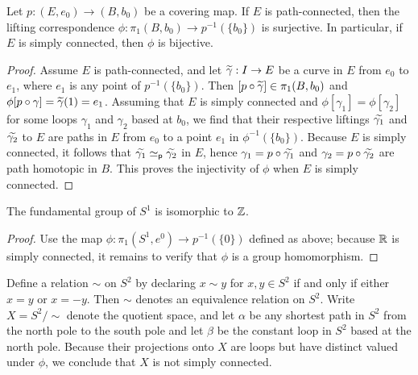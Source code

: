 \begin{thm}
    Let $p: (E, e_0)\rightarrow (B, b_0)$ be a covering map.
    If $E$ is path-connected, then the lifting correspondence $\phi: \pi_1(B, b_0)\rightarrow p^{-1}(\{b_0\})$ is surjective.
    In particular, if $E$ is simply connected, then $\phi$ is bijective.
\end{thm}
\begin{proof}
    Assume $E$ is path-connected, and let $\widetilde{\gamma}: I\rightarrow E$ be a curve in $E$ from $e_0$ to $e_1$, where $e_1$ is any point of $p^{-1}(\{b_0\})$.
    Then $[p\circ\widetilde{\gamma}]\in \pi_1(B, b_0)$ and $\phi[p\circ\gamma]=\widetilde{\gamma}(1)=e_1$.
    Assuming that $E$ is simply connected and $\phi[\gamma_1]=\phi[\gamma_2]$ for some loops $\gamma_1$ and $\gamma_2$ based at $b_0$, we find that their respective liftings $\widetilde{\gamma_1}$ and $\widetilde{\gamma_2}$ to $E$ are paths in $E$ from $e_0$ to a point $e_1$ in $\phi^{-1}(\{b_0\})$.
    Because $E$ is simply connected, it follows that $\widetilde{\gamma_1}\simeq_\textsf{p}\widetilde{\gamma_2}$ in $E$, hence $\gamma_1=p\circ\widetilde{\gamma_1}$ and $\gamma_2=p\circ\widetilde{\gamma_2}$ are path homotopic in $B$.
    This proves the injectivity of $\phi$ when $E$ is simply connected.
\end{proof}

\begin{thm}
    The fundamental group of $S^1$ is isomorphic to ${\mathbb{Z}}$.
\end{thm}
\begin{proof}
    \color{brown}Use the map $\phi: \pi_1(S^1, e^0)\rightarrow p^{-1}(\{0\})$ defined as above; because ${\mathbb{R}}$ is simply connected, it remains to verify that $\phi$ is a group homomorphism.\color{black}
\end{proof}

\begin{exmp}
    Define a relation $\sim$ on $S^2$ by declaring $x\sim y$ for $x, y\in S^2$ if and only if either $x=y$ or $x=-y$.
    Then $\sim$ denotes an equivalence relation on $S^2$.
    Write $X=S^2/\sim$ denote the quotient space, and let $\alpha$ be any shortest path in $S^2$ from the north pole to the south pole and let $\beta$ be the constant loop in $S^2$ based at the north pole.
    Because their projections onto $X$ are loops but have distinct valued under $\phi$, we conclude that $X$ is not simply connected.
\end{exmp}

